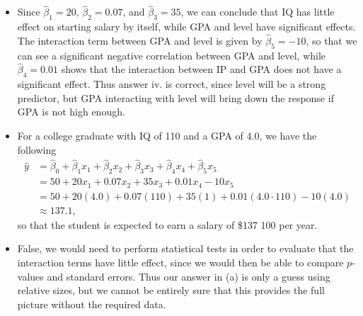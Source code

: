 \begin{itemize}
    \item[(a)]
        Since $\hat{\beta}_1 = 20$, $\hat{\beta}_2 = 0.07$, and
        $\hat{\beta}_3 = 35$,
        we can conclude that IQ has little effect on starting salary by
        itself, while
        GPA and level have significant effects. The interaction term between GPA and
        level is given by $\hat{\beta}_5 = -10$, so that we can see a significant
        negative correlation between GPA and level, while $\hat{\beta}_4
        = 0.01$ shows
        that the interaction between IP and GPA does not have a significant effect.
        Thus answer iv. is correct, since level will be a strong predictor, but GPA
        interacting with level will bring down the response if GPA is not
        high enough.
    \item[(b)]
        For a college graduate with IQ of 110 and a GPA of 4.0, we have
        the following
        \begin{equation*}
            \begin{split}
                \hat{y} &= \hat{\beta}_0 + \hat{\beta}_1 x_1 + \hat{\beta}_2 x_2 +
                \hat{\beta}_3 x_3 + \hat{\beta}_4 x_4 + \hat{\beta}_5 x_5 \\
                &= 50 + 20 x_1 + 0.07x_2 + 35x_3 + 0.01x_4 - 10x_5 \\
                &= 50 + 20(4.0) + 0.07(110) + 35(1) + 0.01(4.0 \cdot 110)
                - 10(4.0) \\
                &\approx 137.1,
            \end{split}
        \end{equation*}
        so that the student is expected to earn a salary of \$137 100 per year.
    \item[(c)]
        False, we would need to perform statistical tests in order to evaluate that
        the interaction terms have little effect, since we would then be able to
        compare $p$-values and standard errors. Thus our answer in (a) is only
        a guess using relative sizes, but we cannot be entirely sure that this
        provides the full picture without the required data.
\end{itemize}

